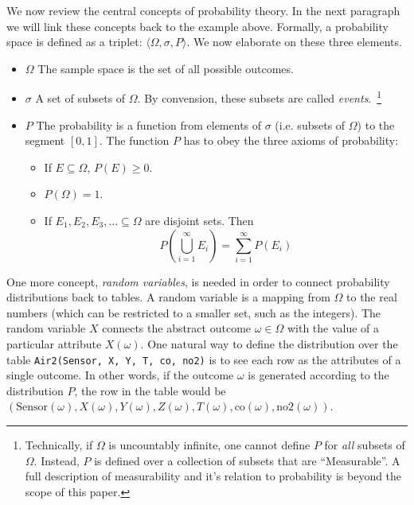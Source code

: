We now review the central concepts of probability theory. In the next
paragraph we will link these concepts back to the example above.
Formally, a probability space is defined as a triplet: $\langle
\Omega, \sigma, P  \rangle$. We now elaborate on these three elements.
\begin{itemize}
\item {\bf $\Omega$} The sample space is the set of all possible outcomes.
\item {\bf $\sigma$} A set of subsets of
  $\Omega$. By convension, these subsets are called {\em events}.~\footnote{Technically, if $\Omega$ is uncountably
  infinite, one cannot define $P$ for {\em all} subsets of
  $\Omega$. Instead, $P$ is defined over a collection of subsets that
  are ``Measurable''. A full description of measurability and it's
  relation to probability is beyond the scope of this paper.}
\item {\bf $P$} The probability is a function from elements of
  $\sigma$ (i.e. subsets of $\Omega$) to the segment $[0,1]$. The function $P$
  has to obey the three axioms of probability:
\begin{itemize}
\item If $E \subseteq \Omega$, $P(E) \geq 0$.  
\item $P(\Omega)=1$.
\item If $E_1,E_2,E_3,... \subseteq \Omega$ are disjoint sets. Then 
$$ P\left(\bigcup_{i=1}^{\infty} E_i \right)=\sum_{i=1}^{\infty}
  P(E_i) $$
\end{itemize}
\end{itemize}

One more concept, {\em random variables}, is needed in order to
connect probability distributions back to tables. A random variable is
a mapping from $\Omega$ to the real numbers (which can be restricted
to a smaller set, such as the integers). The random variable $X$ connects
the abstract outcome $\omega \in \Omega$ with the value of a
particular attribute $X(\omega)$.
One natural way to define the
distribution over the table \texttt{Air2(Sensor, X, Y, T, co,
  no2)} is to see each row as the attributes of a single outcome. 
In
other words, if the outcome $\omega$ is generated according to the
distribution $P$, the row in the table would be
$(\mbox{Sensor}(\omega),X(\omega),Y(\omega),Z(\omega),T(\omega),\mbox{co}(\omega),\mbox{no2}(\omega))$.

